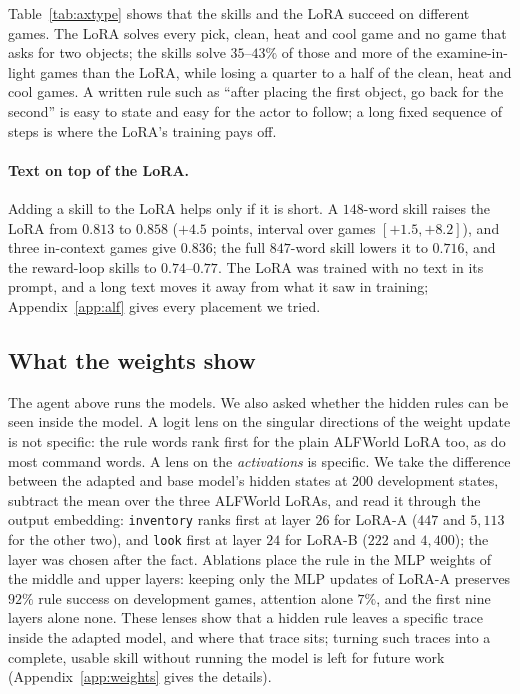 \documentclass[11pt]{article}
\begin{document}
Table~\ref{tab:axtype} shows that the skills and the LoRA succeed on different games. The LoRA solves every pick, clean, heat and cool game and no game that
asks for two objects; the skills solve $35$--$43\%$ of those and more of the examine-in-light games than the LoRA, while losing a quarter to a half of
the clean, heat and cool games. A written rule such as ``after placing the first object, go back for the second'' is easy to state and easy for the actor
to follow; a long fixed sequence of steps is where the LoRA's training pays off.

\paragraph{Text on top of the LoRA.} Adding a skill to the LoRA helps only if it is short. A $148$-word skill raises the LoRA from $0.813$ to $0.858$
($+4.5$ points, interval over games $[+1.5,+8.2]$), and three in-context games give $0.836$; the full $847$-word skill lowers it to $0.716$, and the
reward-loop skills to $0.74$--$0.77$. The LoRA was trained with no text in its prompt, and a long text moves it away from what it saw in training;
Appendix~\ref{app:alf} gives every placement we tried.

\subsection{What the weights show}
\label{sec:ax-weights}

The agent above runs the models. We also asked whether the hidden rules can be seen inside the model. A logit lens on the singular directions
of the weight update is not specific: the rule words rank first for the plain ALFWorld LoRA too, as do most command words. A lens on the
\emph{activations} is specific. We take the difference between the adapted and base model's hidden states at $200$ development states, subtract the
mean over the three ALFWorld LoRAs, and read it through the output embedding: \texttt{inventory} ranks first at layer $26$ for LoRA-A ($447$ and
$5{,}113$ for the other two), and \texttt{look} first at layer $24$ for LoRA-B ($222$ and $4{,}400$); the layer was chosen after the fact. Ablations
place the rule in the MLP weights of the middle and upper layers: keeping only the MLP updates of LoRA-A preserves $92\%$ rule success on development
games, attention alone $7\%$, and the first nine layers alone none. These lenses show that a hidden rule leaves a specific trace inside the adapted model, and where that trace sits; turning such traces into a
complete, usable skill without running the model is left for future work (Appendix~\ref{app:weights} gives the details).
\end{document}
